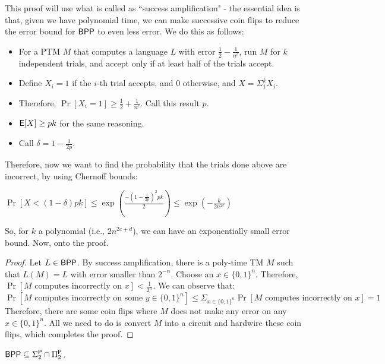 This proof will use what is called as ``success amplification" - the essential idea is that, given we have polynomial time, we can make successive coin flips to reduce the error bound for ${\mathsf{BPP}}$ to even less error. We do this as follows:
\begin{itemize}
\item For a PTM $M$ that computes a language $L$ with error $\frac{1}{2} - \frac{1}{n^c}$, run $M$ for $k$ independent trials, and accept only if at least half of the trials accept. 
\item Define $X_i = 1$ if the $i$-th trial accepts, and 0 otherwise, and $X = \Sigma_1^k X_i$. 
\item Therefore, $\Pr[X_i = 1] \ge \frac{1}{2} + \frac{1}{n^c}$. Call this result $p$.
\item ${\mathsf{E}}[X] \ge pk$ for the same reasoning.
\item Call $\delta = 1-\frac{1}{2p}$.
\end{itemize}
Therefore, now we want to find the probability that the trials done above are incorrect, by using Chernoff bounds:
\begin{center}
$\Pr[X < (1-\delta)pk] \le \exp(\frac{-{(1-\frac{1}{2p})^2}pk}{2}) \le \exp(-\frac{k}{2n^{2c}})$
\end{center}
So, for $k$ a polynomial (i.e., $2n^{2c+d}$), we can have an exponentially small error bound. Now, onto the proof.

\begin{proof}
Let $L \in {\ensuremath{\mathsf{BPP}}}$. By success amplification, there is a poly-time TM $M$ such that $L(M) = L$ with error smaller than $2^{-n}$. Choose an $x \in \{0, 1\}^n$. Therefore, $\Pr[\text{$M$ computes incorrectly on $x$}] < \frac{1}{2^n}$. We can observe that:
\[
\Pr[\text{$M$ computes incorrectly on some $y \in \{0, 1\}^n$}] \le \Sigma_{x \in \{0, 1\}^n} \Pr[\text{$M$ computes incorrectly on $x$}] = 1
\]
Therefore, there are some coin flips where $M$ does not make any error on any $x \in \{0, 1\}^n$. All we need to do is convert $M$ into a circuit and hardwire these coin flips, which completes the proof. 
\end{proof}

\begin{theorem}[Sipser-G\'{a}cs]
${\mathsf{BPP}} \subseteq \Sigma_2^{\mathsf{P}} \cap \Pi_2^{\mathsf{P}}$.
\end{theorem}

